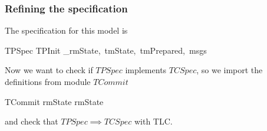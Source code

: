 \begin{frame}
    \frametitle{Refining the specification}

    The specification for this model is
    \begin{tlabox}
        TPSpec  TPInit \land \Box [TPNext]_{\langle rmState,\, tmState,\,
        tmPrepared,\, msgs \rangle}
    \end{tlabox}

    Now we want to check if $TPSpec$ implements $TCSpec$, so we import the
    definitions from module $TCommit$
    \begin{tlabox}
        \INSTANCE TCommit \textcolor{gray!50}{\WITH rmState \leftarrow rmState}
    \end{tlabox}
    and check that \alert{$TPSpec \implies TCSpec$} with TLC.

    \begin{center}
        \scriptsize
    \end{center}

\end{frame}

